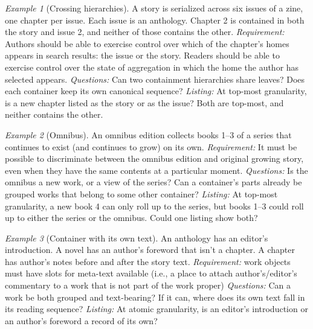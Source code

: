 \documentclass{amsart}
\theoremstyle{remark}
\newtheorem{eg}{Example}
\begin{document}
    \begin{eg}[Crossing hierarchies]\label{eg:zine-serial}
        A story is serialized across six issues of a zine, one chapter per issue. Each issue is an anthology. Chapter 2 is contained in both the story and issue 2, and neither of those contains the other.
        \emph{Requirement:} Authors should be able to exercise control over which of the chapter's homes appears in search results: the issue or the story. Readers should be able to exercise control over the state of aggregation in which the home the author has selected appears. 
        \emph{Questions:} Can two containment hierarchies share leaves? Does each container keep its own canonical sequence?
        \emph{Listing:} At top-most granularity, is a new chapter listed as the story or as the issue? Both are top-most, and neither contains the other.
    \end{eg}
    \begin{eg}[Omnibus]\label{eg:omnibus}
        An omnibus edition collects books 1--3 of a series that continues to exist (and continues to grow) on its own.
        \emph{Requirement:} It must be possible to discriminate between the omnibus edition and original growing story, even when they have the same contents at a particular moment.
        \emph{Questions:} Is the omnibus a new work, or a view of the series? Can a container's parts already be grouped works that belong to some other container?
        \emph{Listing:} At top-most granularity, a new book 4 can only roll up to the series, but books 1--3 could roll up to either the series or the omnibus. Could one listing show both?
    \end{eg}
    \begin{eg}[Container with its own text]\label{eg:container-text}
        An anthology has an editor's introduction. A novel has an author's foreword that isn't a chapter. A chapter has author's notes before and after the story text.
        \emph{Requirement:} work objects must have slots for meta-text available (i.e., a place to attach author's/editor's commentary to a work that is not part of the work proper)
        \emph{Questions:} Can a work be both grouped and text-bearing? If it can, where does its own text fall in its reading sequence?
        \emph{Listing:} At atomic granularity, is an editor's introduction or an author's foreword a record of its own?
    \end{eg}
\end{document}
